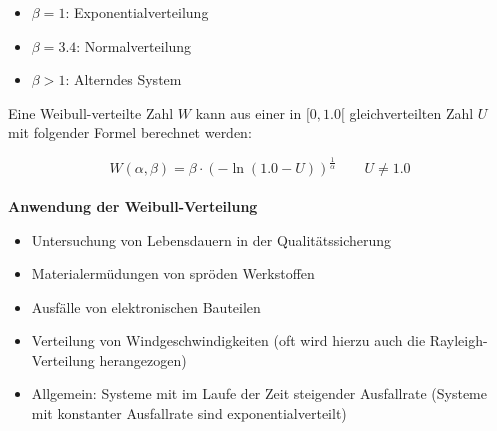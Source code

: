 \begin{itemize}
	\item $\beta = 1$:  Exponentialverteilung
	\item $\beta = 3.4$:  Normalverteilung
	\item $\beta > 1$:  Alterndes System
\end{itemize}


Eine Weibull-verteilte Zahl $W$ kann aus einer in $[0, 1.0[$ gleichverteilten Zahl $U$ mit folgender Formel berechnet werden:

\begin{equation}
	W(\alpha,\beta) = \beta \cdot (-\ln(1.0-U))^\frac{1}{\alpha}  \qquad U \neq 1.0
\end{equation}\\


\textbf{Anwendung der Weibull-Verteilung}

\begin{itemize}
	\item Untersuchung von Lebensdauern in der Qualitätssicherung
	\item Materialermüdungen von spröden Werkstoffen
	\item Ausfälle von elektronischen Bauteilen
	\item Verteilung von Windgeschwindigkeiten (oft wird hierzu auch die Rayleigh-Verteilung herangezogen)
	\item Allgemein: Systeme mit im Laufe der Zeit steigender Ausfallrate (Systeme mit konstanter Ausfallrate sind exponentialverteilt)
\end{itemize}
